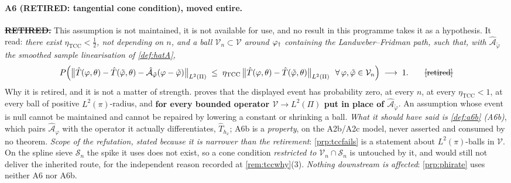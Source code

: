 \paragraph{A6 (RETIRED: tangential cone condition), moved entire.}

\begin{assumption}\label{ass:tcc}
\textbf{\sout{RETIRED.}} This assumption is not maintained, it is not available for use, and no
result in this programme takes it as a hypothesis. It read: \emph{there exist
$\eta_{\mathrm{TCC}}<\tfrac12$, not depending on $n$, and a ball
$\mathcal V_n\subset\mathcal V$ around $\varphi_{\dagger}$ containing the Landweber--Fridman path, such that, with
$\hat{\mathcal A}_{\tilde\varphi}$ the smoothed sample linearisation of \cref{def:hatA},}
\[
P\Big(\big\|\hat T(\varphi,\theta)-\hat T(\tilde\varphi,\theta)-\hat{\mathcal A}_{\tilde\varphi}(\varphi-\tilde\varphi)\big\|_{L^2(\Pi)}
\;\le\;\eta_{\mathrm{TCC}}\,\big\|\hat T(\varphi,\theta)-\hat T(\tilde\varphi,\theta)\big\|_{L^2(\Pi)}
\ \ \forall\,\varphi,\tilde\varphi\in\mathcal V_n\Big)\;\longrightarrow\;1 .
\qquad\text{\sout{[retired]}}
\]
Why it is retired, and it is not a matter of strength.  proves that the
displayed event has probability zero, at every $n$, at every $\eta_{\mathrm{TCC}}<1$, at every ball
of positive $L^{2}(\pi)$-radius, and \textbf{for every bounded operator $\mathcal V\to L^{2}(\Pi)$ put
in place of $\hat{\mathcal A}_{\tilde\varphi}$}. An assumption whose event is null cannot be maintained
and cannot be repaired by lowering a constant or shrinking a ball.
\emph{What it should have said is \cref{def:a6b} (A6b)}, which pairs $\hat{\mathcal A}_\varphi$ with the
operator it actually differentiates, $\hat T_{h_x}$; A6b is a \emph{property}, on the A2b/A2c model,
never asserted and consumed by no theorem. \emph{Scope of the refutation, stated because it is
narrower than the retirement}: \cref{prp:tccfails} is a statement about $L^{2}(\pi)$-balls in
$\mathcal V$. On the spline sieve $\mathcal S_n$ the spike it uses does not exist, so a cone condition
\emph{restricted to $\mathcal V_n\cap\mathcal S_n$} is untouched by it, and would still not deliver
the inherited route, for the independent reason recorded at \cref{rem:tccwhy}\textup{(3)}.
\emph{Nothing downstream is affected}: \cref{prp:phirate} uses neither A6 nor A6b.
\end{assumption}

